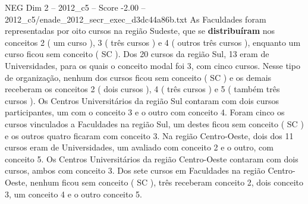 \begin{textsample}{NEG Dim 2 – 2012\_c5 – Score -2.00 – 2012\_c5/enade\_2012\_secr\_exec\_d3dc44a86b.txt}
As Faculdades foram representadas por oito cursos na região Sudeste, que se \textbf{distribuíram} nos conceitos 2 ( um curso ), 3 ( três cursos ) e 4 ( outros três cursos ), enquanto um curso ficou sem conceito ( SC ).
Dos 20 cursos da região Sul, 13 eram de Universidades, para os quais o conceito modal foi 3, com cinco cursos.
Nesse tipo de organização, nenhum dos cursos ficou sem conceito ( SC ) e os demais receberam os conceitos 2 ( dois cursos ), 4 ( três cursos ) e 5 ( também três cursos ).
Os Centros Universitários da região Sul contaram com dois cursos participantes, um com o conceito 3 e o outro com conceito 4.
Foram cinco os cursos vinculados a Faculdades na região Sul, um destes ficou sem conceito ( SC ) e os outros quatro ficaram com conceito 3.
Na região Centro-Oeste, dois dos 11 cursos eram de Universidades, um avaliado com conceito 2 e o outro, com conceito 5.
Os Centros Universitários da região Centro-Oeste contaram com dois cursos, ambos com conceito 3.
Dos sete cursos em Faculdades na região Centro-Oeste, nenhum ficou sem conceito ( SC ), três receberam conceito 2, dois conceito 3, um conceito 4 e o outro conceito 5.

\end{textsample}
